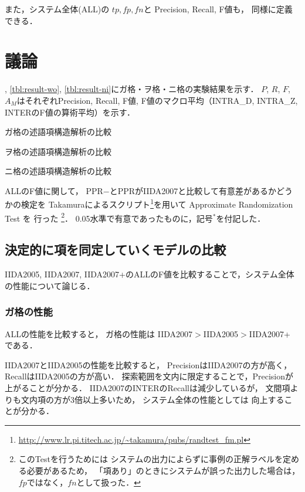 \documentclass[japanese]{jnlp_1.4}
\newcommand{\tblref}[1]{}
\begin{document}
また，システム全体(ALL)の
$tp, fp, fn$と
Precision, Recall, F値も，
同様に定義できる．




\section{議論}

\tblref{tbl:result-ga}, \ref{tbl:result-wo}, \ref{tbl:result-ni}にガ格・ヲ格・ニ格の実験結果を示す．
$P$, $R$, $F$, $A_M$はそれぞれPrecision, Recall, F値,
F値のマクロ平均（INTRA\_D, INTRA\_Z, INTERのF値の算術平均）を示す．


\begin{table}[tb]
\caption{ガ格の述語項構造解析の比較}
\label{tbl:result-ga}

\end{table}
\begin{table}[tb]
\caption{ヲ格の述語項構造解析の比較}
\label{tbl:result-wo}

\end{table}
\begin{table}[tb]
\caption{ニ格の述語項構造解析の比較}
\label{tbl:result-ni}

\end{table}

ALLのF値に関して，
PPR$-$とPPRがIIDA2007と比較して有意差があるかどうかの検定を
Takamuraによるスクリプト\footnote{\url{http://www.lr.pi.titech.ac.jp/~takamura/pubs/randtest_fm.pl}}を用いて
Approximate Randomization Test \cite{Chinchor:1993:CL}を
行った
\footnote{このTestを行うためには
システムの出力によらずに事例の正解ラベルを定める必要があるため，
「項あり」のときにシステムが誤った出力した場合は，$fp$ではなく，$fn$として扱った．}．
0.05水準で有意であったものに，記号$^{*}$を付記した．


\subsection{決定的に項を同定していくモデルの比較}
\label{sec:discussion-determin}
IIDA2005, IIDA2007, IIDA2007+のALLのF値を比較することで，システム全体の性能について論じる．

\subsubsection{ガ格の性能}

ALLの性能を比較すると，
ガ格の性能は
IIDA2007$>$IIDA2005$>$IIDA2007+
である．

IIDA2007とIIDA2005の性能を比較すると，
PrecisionはIIDA2007の方が高く，RecallはIIDA2005の方が高い．
探索範囲を文内に限定することで，Precisionが上がることが分かる．
IIDA2007のINTERのRecallは減少しているが，
文間項よりも文内項の方が3倍以上多いため，
システム全体の性能としては
向上することが分かる．
\end{document}
